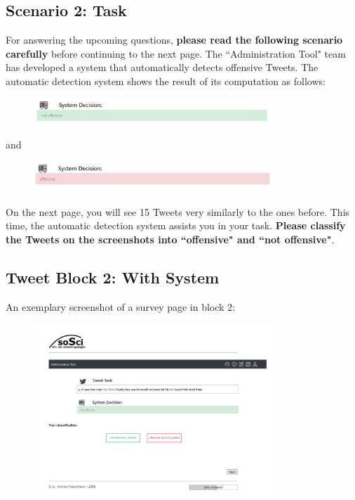 \subsection{Scenario 2: Task}
For answering the upcoming questions, \textbf{please read the following scenario carefully} before continuing to the next page. \medskip \newline
The ``Administration Tool" team has developed a system that automatically detects offensive Tweets.
The automatic detection system shows the result of its computation as follows:
\begin{figure} [H]
	\centering
	\includegraphics[width=0.8\textwidth]{img/example_decNotOffensive.JPG}
	\label{fig:app_decision_non_offensive}
\end{figure}
and 
\begin{figure} [H]
	\centering
	\includegraphics[width=0.8\textwidth]{img/example_decOffensive.JPG}
	\label{fig:app_decision_offensive}
\end{figure}
\noindent On the next page, you will see 15 Tweets very similarly to the ones before. This time, the automatic detection system assists you in your task.\newline
\textbf{Please classify the Tweets on the screenshots into ``offensive" and ``not offensive"}.



\subsection{Tweet Block 2: With System}
An exemplary screenshot of a survey page in block 2:
\begin{figure} [H]
	\centering
	\includegraphics[width=0.8\textwidth]{img/app_screenshot_sys.JPG}
	\label{fig:app_block2}
\end{figure}



